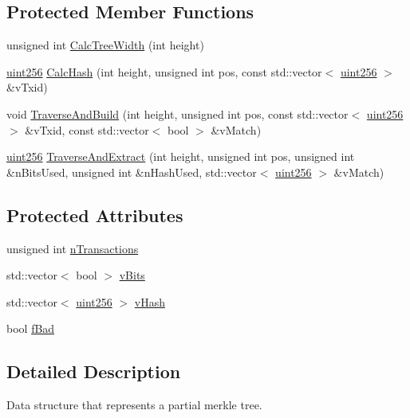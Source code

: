 \subsection*{Protected Member Functions}
\begin{DoxyCompactItemize}
\item 
unsigned int \hyperlink{class_c_partial_merkle_tree_a7dd0288d62321fb5aa2c27a3372ee8fe}{Calc\+Tree\+Width} (int height)
\item 
\hyperlink{classuint256}{uint256} \hyperlink{class_c_partial_merkle_tree_a69e7771f95c498f6a340dcc227abcde4}{Calc\+Hash} (int height, unsigned int pos, const std\+::vector$<$ \hyperlink{classuint256}{uint256} $>$ \&v\+Txid)
\item 
void \hyperlink{class_c_partial_merkle_tree_a62bdcaf5b5ee6c6327ef67fb027a5fef}{Traverse\+And\+Build} (int height, unsigned int pos, const std\+::vector$<$ \hyperlink{classuint256}{uint256} $>$ \&v\+Txid, const std\+::vector$<$ bool $>$ \&v\+Match)
\item 
\hyperlink{classuint256}{uint256} \hyperlink{class_c_partial_merkle_tree_a3ddbe75a92d93059c30f6e60bacc7054}{Traverse\+And\+Extract} (int height, unsigned int pos, unsigned int \&n\+Bits\+Used, unsigned int \&n\+Hash\+Used, std\+::vector$<$ \hyperlink{classuint256}{uint256} $>$ \&v\+Match)
\end{DoxyCompactItemize}
\subsection*{Protected Attributes}
\begin{DoxyCompactItemize}
\item 
unsigned int \hyperlink{class_c_partial_merkle_tree_a0d3bd530f19f2c75c140a05c6f99782a}{n\+Transactions}
\item 
std\+::vector$<$ bool $>$ \hyperlink{class_c_partial_merkle_tree_a22a522d1fb8d449f4c91b65283339e7d}{v\+Bits}
\item 
std\+::vector$<$ \hyperlink{classuint256}{uint256} $>$ \hyperlink{class_c_partial_merkle_tree_a863cf9024be1b8fa97db08dfd6dbd687}{v\+Hash}
\item 
bool \hyperlink{class_c_partial_merkle_tree_a24bb0d9d17d6001dcfbca4d550c64ba3}{f\+Bad}
\end{DoxyCompactItemize}


\subsection{Detailed Description}
Data structure that represents a partial merkle tree.

